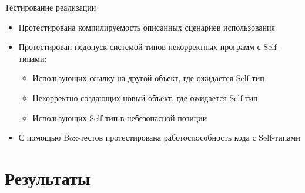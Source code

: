 \documentclass[handout,aspectratio=169,usenames,dvipsnames]{beamer}
\begin{document}
    \begin{frame}{Тестирование реализации}
        \begin{itemize}
            \item Протестирована компилируемость описанных сценариев использования
            \item Протестирован недопуск системой типов некорректных программ с Self-типами:
            \begin{itemize}
                \item Использующих ссылку на другой объект, где ожидается Self-тип
                \item Некорректно создающих новый объект, где ожидается Self-тип
                \item Использующих Self-тип в небезопасной позиции
            \end{itemize}
            \item С помощью Box-тестов протестирована работоспособность кода с Self-типами
        \end{itemize}
    \end{frame}


    \section{Результаты}
\end{document}
